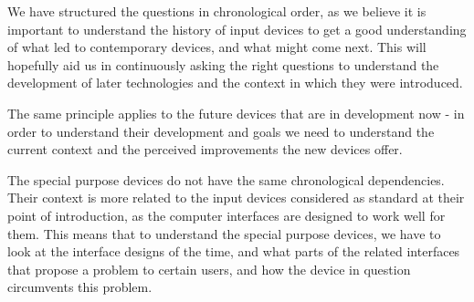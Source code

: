 \documentclass[a4paper,10pt]{article}
\begin{document}
We have structured the questions in chronological order, as we believe it is important to understand the history of input devices to get a good understanding of what led to contemporary devices, and what might come next. This will hopefully aid us in continuously asking the right questions to understand the development of later technologies and the context in which they were introduced.

The same principle applies to the future devices that are in development now - in order to understand their development and goals we need to understand the current context and the perceived improvements the new devices offer.

The special purpose devices do not have the same chronological dependencies. Their context is more related to the input devices considered as standard at their point of introduction, as the computer interfaces are designed to work well for them. This means that to understand the special purpose devices, we have to look at the interface designs of the time, and what parts of the related interfaces that propose a problem to certain users, and how the device in question circumvents this problem.
\end{document}
